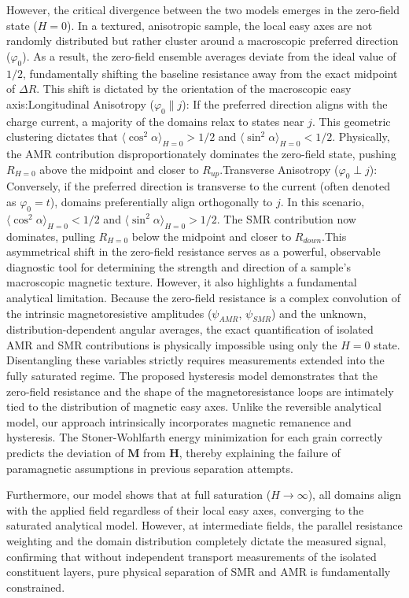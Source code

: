 \documentclass[11pt,a4paper]{article}
\begin{document}
However, the critical divergence between the two models emerges in the zero-field state ($H=0$). In a textured, anisotropic sample, the local easy axes are not randomly distributed but rather cluster around a macroscopic preferred direction ($\varphi_0$). As a result, the zero-field ensemble averages deviate from the ideal value of $1/2$, fundamentally shifting the baseline resistance away from the exact midpoint of $\Delta R$. This shift is dictated by the orientation of the macroscopic easy axis:Longitudinal Anisotropy ($\varphi_0 \parallel j$): If the preferred direction aligns with the charge current, a majority of the domains relax to states near $j$. This geometric clustering dictates that $\langle \cos^2\alpha \rangle_{H=0} > 1/2$ and $\langle \sin^2\alpha \rangle_{H=0} < 1/2$. Physically, the AMR contribution disproportionately dominates the zero-field state, pushing $R_{H=0}$ above the midpoint and closer to $R_{up}$.Transverse Anisotropy ($\varphi_0 \perp j$): Conversely, if the preferred direction is transverse to the current (often denoted as $\varphi_0 = t$), domains preferentially align orthogonally to $j$. In this scenario, $\langle \cos^2\alpha \rangle_{H=0} < 1/2$ and $\langle \sin^2\alpha \rangle_{H=0} > 1/2$. The SMR contribution now dominates, pulling $R_{H=0}$ below the midpoint and closer to $R_{down}$.This asymmetrical shift in the zero-field resistance serves as a powerful, observable diagnostic tool for determining the strength and direction of a sample's macroscopic magnetic texture. However, it also highlights a fundamental analytical limitation. Because the zero-field resistance is a complex convolution of the intrinsic magnetoresistive amplitudes ($\psi_{AMR}$, $\psi_{SMR}$) and the unknown, distribution-dependent angular averages, the exact quantification of isolated AMR and SMR contributions is physically impossible using only the $H=0$ state. Disentangling these variables strictly requires measurements extended into the fully saturated regime.
The proposed hysteresis model demonstrates that the zero-field resistance and the shape of the magnetoresistance loops are intimately tied to the distribution of magnetic easy axes. Unlike the reversible analytical model, our approach intrinsically incorporates magnetic remanence and hysteresis. The Stoner-Wohlfarth energy minimization for each grain correctly predicts the deviation of $\mathbf{M}$ from $\mathbf{H}$, thereby explaining the failure of paramagnetic assumptions in previous separation attempts. 

Furthermore, our model shows that at full saturation ($H \to \infty$), all domains align with the applied field regardless of their local easy axes, converging to the saturated analytical model. However, at intermediate fields, the parallel resistance weighting and the domain distribution completely dictate the measured signal, confirming that without independent transport measurements of the isolated constituent layers, pure physical separation of SMR and AMR is fundamentally constrained.
\end{document}
